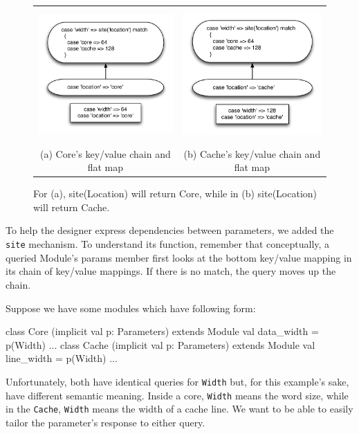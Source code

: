\documentclass[10pt,twocolumn]{article}
\def\code#1{{\small\tt #1}}
\begin{document}
\begin{figure}
\begin{center}
\begin{tabular}{cc}
\includegraphics[height=2.0in]{figs/sitea.pdf} &
\includegraphics[height=2.0in]{figs/siteb.pdf} \\
(a) Core's key/value chain and flat map & (b) Cache's key/value chain and flat map \\
\end{tabular}
\end{center}
\caption{For (a), site(Location) will return Core, while in (b) site(Location) will return Cache.}
\label{fig:site}
\end{figure}
To help the designer express dependencies between parameters, we added the \code{site} mechanism. To understand its function, remember that conceptually, a queried Module's params member first looks at the bottom key/value mapping in its chain of key/value mappings. If there is no match, the query moves up the chain. 

Suppose we have some modules which have following form:

\begin{scala}
class Core (implicit val p: Parameters) extends Module {
  val data_width = p(Width)
  ...
}
class Cache (implicit val p: Parameters) extends Module {
  val line_width = p(Width)
  ...
}
\end{scala}
Unfortunately, both have identical queries for \code{Width} but, for this example's sake, have different semantic meaning. Inside a core, \code{Width} means the word size, while in the \code{Cache}, \code{Width} means the width of a cache line. We want to be able to easily tailor the parameter's response to either query.
\end{document}
